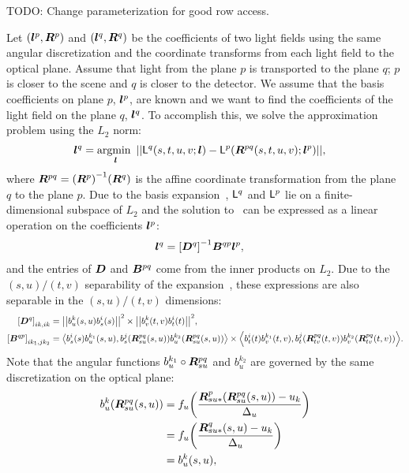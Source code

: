 TODO: Change parameterization for good row access.

Let $ {\left( {\bm{l}}^p, {\bm{R}}^p \right)}$ and $ {\left( {\bm{l}}^q, {\bm{R}}^q \right)}$ be the coefficients of two
light fields using the same angular discretization and the coordinate
transforms from each light field to the optical plane.  Assume that light
from the plane $p$ is transported to the plane $q$; \ie{} $p$ is closer to the
scene and $q$ is closer to the detector.  We assume that the basis coefficients
on plane $p$, ${\bm{l}}^p$, are known and we want to find the coefficients of the
light field on the plane $q$, ${\bm{l}}^q$.  To accomplish this, we solve the 
approximation problem using the $L_2$ norm:
\begin{align}
    \bl^q 
    &=
    \argmin_{\bl}
    \GN{%
        \LF^q\GP{s,t,u,v; \bl}
        -
        \LF^p\GP{\bR^{pq}\GP{s,t,u,v}; \bl^p}
    },
    \label{eqn,xport}
\end{align}
where ${\bm{R}}^{pq} =  {\left( {\bm{R}}^p \right)}^{-1} {\left( {\bm{R}}^q \right)}$ is the affine coordinate
transformation from the plane $q$ to the plane $p$.  Due to the basis 
expansion~, $\mathsf{L}^q$ and $\mathsf{L}^p$ lie on a finite-dimensional
subspace of $L_2$ and the solution to~ can be expressed as a 
linear operation on the coefficients ${\bm{l}}^p$:
\begin{align}
    {\ensuremath{\bm{l}}}^q
    &=
     {\left[ {\bm{D}}^q \right] }^{-1} {\bm{B}}^{qp} {\bm{l}}^p,
    \label{eqn,xport,soln}
\end{align}
and the entries of ${\bm{D}}$ and ${\bm{B}}^{pq}$ come from the inner products on
$L_2$.  Due to the $(s,u)/(t,v)$ separability of the 
expansion~, these expressions are also separable in the
$(s,u)/(t,v)$ dimensions:
\begin{align}
    \GB{\bD^q}_{ik, ik}
    &=
    \GN{%
        b^k_u\GP{s,u} b^i_s\GP{s}
    }^2
    \times
    \GN{%
        b^k_v\GP{t,v} b^i_t\GP{t}
    }^2,
    \nonumber \\
    \GB{\bB^{qp}}_{ik_1, jk_2}
    &=
    \GA{%
        b^i_s\GP{s} b^{k_1}_u\GP{s,u}, 
        b^j_s\GP{\bR^{pq}_{su}\GP{s,u}} b^{k_2}_u\GP{\bR^{pq}_{su}\GP{s,u}}
    }
    \times
    \GA{%
        b^i_t\GP{t} b^{k_1}_v\GP{t,v},
        b^j_t\GP{\bR^{pq}_{tv}\GP{t,v}} b^{k_2}_v\GP{\bR^{pq}_{tv}\GP{t,v}} 
    }.
    \label{eqn,iprod}
\end{align}
Note that the angular functions $b^{k_1}_u \circ {\ensuremath{\bm{R}}}^{pq}_{su}$ and $b^{k_2}_u$
are governed by the same discretization on the optical plane:
\begin{align}
    b^{k}_u {\left( {\bm{R}}^{pq}_{su} {\left( s,u \right)} \right)}
    &=
    f_u {\left( \frac{{\bm{R}}^p_{su*} {\left( {\bm{R}}^{pq}_{su} {\left( s,u \right)} \right)} - u_{k}}{\Delta_u} \right)} 
    \nonumber \\
    &=
    f_u {\left( \frac{{\bm{R}}^{q}_{su*} {\left( s,u \right)} - u_{k}}{\Delta_u} \right)} 
    \nonumber \\
    &=
    b^{k}_u {\left( s,u \right)},
    \label{eqn,same,angle}
\end{align}
